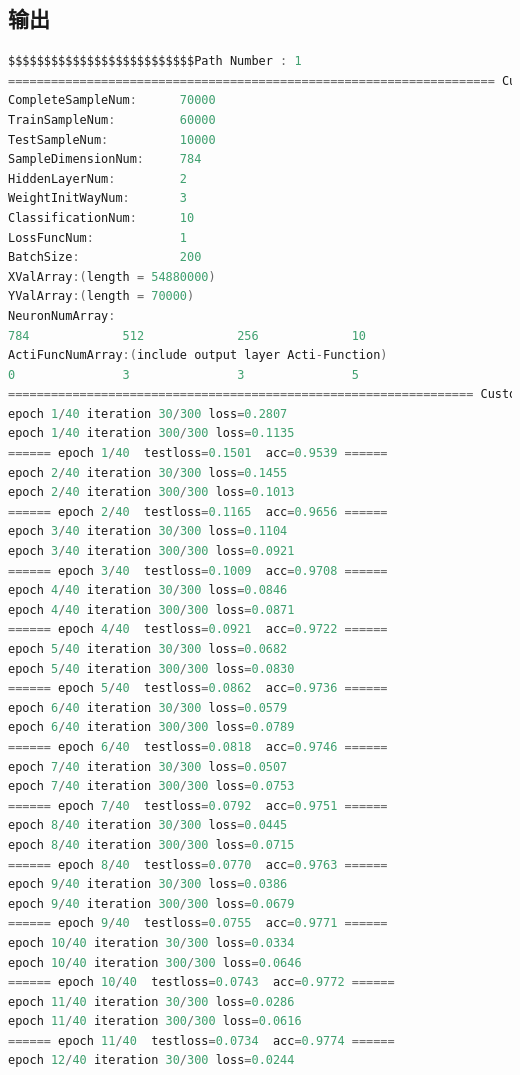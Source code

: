 \documentclass[UTF-8]{progbookcn}
\begin{document}
\subsection{输出}
\begin{lstlisting}[language=C,caption={输出代码}]
$$$$$$$$$$$$$$$$$$$$$$$$$$Path Number : 1
==================================================================== Custom Dump =====================================================================
CompleteSampleNum:      70000
TrainSampleNum:         60000
TestSampleNum:          10000
SampleDimensionNum:     784
HiddenLayerNum:         2
WeightInitWayNum:       3
ClassificationNum:      10
LossFuncNum:            1
BatchSize:              200
XValArray:(length = 54880000)
YValArray:(length = 70000)
NeuronNumArray:
784             512             256             10
ActiFuncNumArray:(include output layer Acti-Function)
0               3               3               5
================================================================= Custom Dump finish =================================================================
epoch 1/40 iteration 30/300 loss=0.2807
epoch 1/40 iteration 300/300 loss=0.1135
====== epoch 1/40  testloss=0.1501  acc=0.9539 ======
epoch 2/40 iteration 30/300 loss=0.1455
epoch 2/40 iteration 300/300 loss=0.1013
====== epoch 2/40  testloss=0.1165  acc=0.9656 ======
epoch 3/40 iteration 30/300 loss=0.1104
epoch 3/40 iteration 300/300 loss=0.0921
====== epoch 3/40  testloss=0.1009  acc=0.9708 ======
epoch 4/40 iteration 30/300 loss=0.0846
epoch 4/40 iteration 300/300 loss=0.0871
====== epoch 4/40  testloss=0.0921  acc=0.9722 ======
epoch 5/40 iteration 30/300 loss=0.0682
epoch 5/40 iteration 300/300 loss=0.0830
====== epoch 5/40  testloss=0.0862  acc=0.9736 ======
epoch 6/40 iteration 30/300 loss=0.0579
epoch 6/40 iteration 300/300 loss=0.0789
====== epoch 6/40  testloss=0.0818  acc=0.9746 ======
epoch 7/40 iteration 30/300 loss=0.0507
epoch 7/40 iteration 300/300 loss=0.0753
====== epoch 7/40  testloss=0.0792  acc=0.9751 ======
epoch 8/40 iteration 30/300 loss=0.0445
epoch 8/40 iteration 300/300 loss=0.0715
====== epoch 8/40  testloss=0.0770  acc=0.9763 ======
epoch 9/40 iteration 30/300 loss=0.0386
epoch 9/40 iteration 300/300 loss=0.0679
====== epoch 9/40  testloss=0.0755  acc=0.9771 ======
epoch 10/40 iteration 30/300 loss=0.0334
epoch 10/40 iteration 300/300 loss=0.0646
====== epoch 10/40  testloss=0.0743  acc=0.9772 ======
epoch 11/40 iteration 30/300 loss=0.0286
epoch 11/40 iteration 300/300 loss=0.0616
====== epoch 11/40  testloss=0.0734  acc=0.9774 ======
epoch 12/40 iteration 30/300 loss=0.0244

\end{lstlisting}
\end{document}
